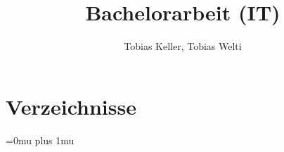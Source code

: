 %
%




\title{Bachelorarbeit (IT)}
\author{Tobias Keller, Tobias Welti}





\setcounter{page}{1}



\tableofcontents
\listoftodos
\newpage
















\chapter{Verzeichnisse}\label{chap.verzeichnisse}
\Urlmuskip=0mu plus 1mu\relax
 
 \begingroup
 \raggedright
 
 \endgroup \newpage
 \listoffigures
 \listoftables
 \printglossary
 \printglossary[type=acronym]
 \lstlistoflistings
 




